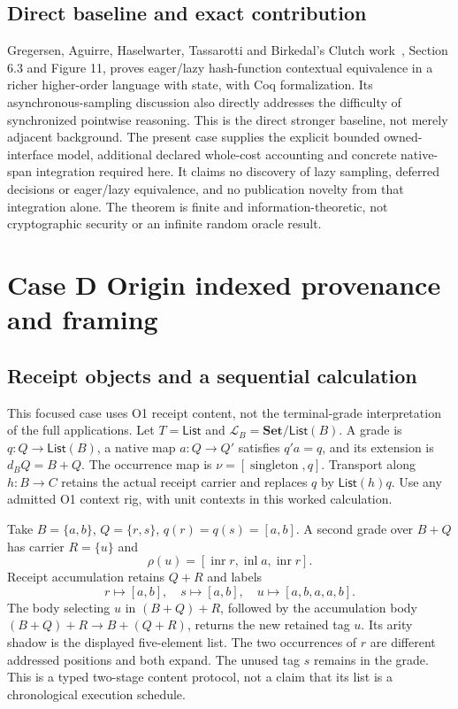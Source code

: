 \documentclass[11pt,a4paper]{article}
\theoremstyle{definition}
\newcommand{\Set}{\mathbf{Set}}
\newcommand{\List}{\mathsf{List}}
\begin{document}
\subsection{Direct baseline and exact contribution}
Gregersen, Aguirre, Haselwarter, Tassarotti and Birkedal's
Clutch work~\cite{Clutch}, Section 6.3 and Figure 11, proves eager/lazy
hash-function contextual equivalence in a richer higher-order language
with state, with Coq formalization. Its asynchronous-sampling discussion
also directly addresses the difficulty of synchronized pointwise reasoning.
This is the direct stronger baseline, not merely adjacent background.
The present case supplies the explicit bounded owned-interface model,
additional declared whole-cost accounting and concrete native-span
integration required here. It claims no discovery of lazy sampling,
deferred decisions or eager/lazy equivalence, and no publication novelty
from that integration alone. The theorem is finite and
information-theoretic, not cryptographic security or an infinite random
oracle result.


\section{Case D Origin indexed provenance and framing}\label{sec:caseD}

\subsection{Receipt objects and a sequential calculation}
This focused case uses O1 receipt content, not the terminal-grade
interpretation of the full applications. Let $T=\List$ and
$\mathcal L_B=\Set/\List(B)$. A grade is $q:Q\to\List(B)$, a native
map $a:Q\to Q'$ satisfies $q'a=q$, and its extension is $d_BQ=B+Q$.
The occurrence map is $\nu=[\operatorname{singleton},q]$. Transport along
$h:B\to C$ retains the actual receipt carrier and replaces $q$ by
$\List(h)q$. Use any admitted O1 context rig, with unit contexts in this
worked calculation.

Take $B=\{a,b\}$, $Q=\{r,s\}$, $q(r)=q(s)=[a,b]$. A second grade over
$B+Q$ has carrier $R=\{u\}$ and
\[
\rho(u)=[\operatorname{inr}r,\operatorname{inl}a,
                         \operatorname{inr}r].
\]
Receipt accumulation retains $Q+R$ and labels
\[
r\mapsto[a,b],\quad s\mapsto[a,b],\quad
u\mapsto[a,b,a,a,b].
\]
The body selecting $u$ in $(B+Q)+R$, followed by the accumulation body
$(B+Q)+R\to B+(Q+R)$, returns the new retained tag $u$. Its arity
shadow is the displayed five-element list. The two occurrences of $r$
are different addressed positions and both expand. The unused tag $s$
remains in the grade. This is a typed two-stage content protocol, not a
claim that its list is a chronological execution schedule.
\end{document}
